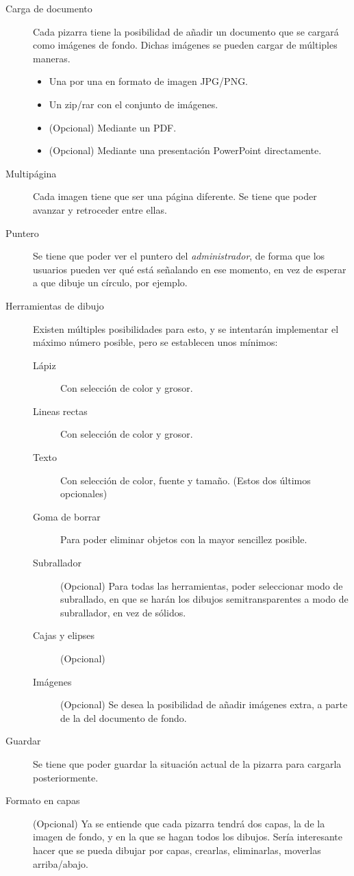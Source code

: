 \begin{description}
	\item[Carga de documento] Cada pizarra tiene la posibilidad de añadir un documento que se cargará como imágenes de fondo. Dichas imágenes se pueden cargar de múltiples maneras.
	\begin{itemize}
		\item Una por una en formato de imagen JPG/PNG.
		\item Un zip/rar con el conjunto de imágenes.
		\item (Opcional) Mediante un PDF.
		\item (Opcional) Mediante una presentación PowerPoint directamente.
	\end{itemize}
	\item[Multipágina] Cada imagen tiene que ser una página diferente. Se tiene que poder avanzar y retroceder entre ellas.
	\item[Puntero] Se tiene que poder ver el puntero del \emph{administrador}, de forma que los usuarios pueden ver qué está señalando en ese momento, en vez de esperar a que dibuje un círculo, por ejemplo.
	\item[Herramientas de dibujo] Existen múltiples posibilidades para esto, y se intentarán implementar el máximo número posible, pero se establecen unos mínimos:
	\begin{description}
		\item[Lápiz] Con selección de color y grosor.
		\item[Lineas rectas] Con selección de color y grosor.
		\item[Texto] Con selección de color, fuente y tamaño. (Estos dos últimos opcionales)
		\item[Goma de borrar] Para poder eliminar objetos con la mayor sencillez posible.
		\item[Subrallador] (Opcional) Para todas las herramientas, poder seleccionar modo de subrallado, en que se harán los dibujos semitransparentes a modo de subrallador, en vez de sólidos.
		\item[Cajas y elipses] (Opcional)
		\item[Imágenes] (Opcional) Se desea la posibilidad de añadir imágenes extra, a parte de la del documento de fondo.
	\end{description}
	\item[Guardar] Se tiene que poder guardar la situación actual de la pizarra para cargarla posteriormente.
	\item[Formato en capas] (Opcional) Ya se entiende que cada pizarra tendrá dos capas, la de la imagen de fondo, y en la que se hagan todos los dibujos. Sería interesante hacer que se pueda dibujar por capas, crearlas, eliminarlas, moverlas arriba/abajo.

\end{description}
